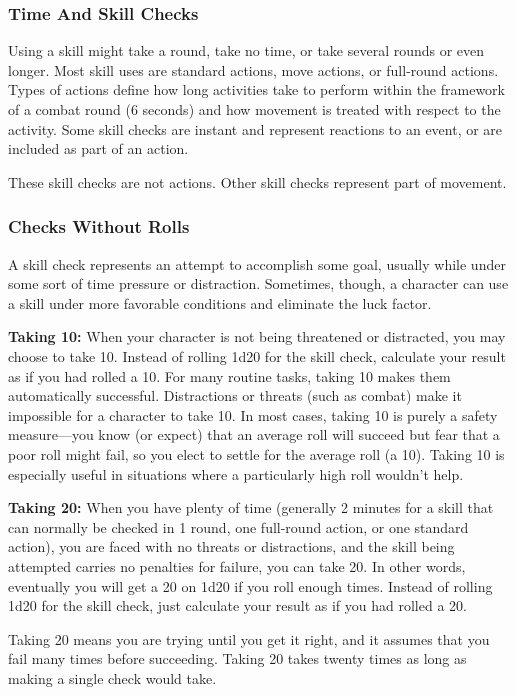 \subsubsection{Time And Skill Checks}
Using a skill might take a round, take no time, or take several rounds or even longer. Most skill uses are standard actions, move actions, or full-round actions. Types of actions define how long activities take to perform within the framework of a combat round (6 seconds) and how movement is treated with respect to the activity. Some skill checks are instant and represent reactions to an event, or are included as part of an action.

These skill checks are not actions. Other skill checks represent part of movement.

\subsubsection{Checks Without Rolls}
A skill check represents an attempt to accomplish some goal, usually while under some sort of time pressure or distraction. Sometimes, though, a character can use a skill under more favorable conditions and eliminate the luck factor.

\textbf{Taking 10:} When your character is not being threatened or distracted, you may choose to take 10. Instead of rolling 1d20 for the skill check, calculate your result as if you had rolled a 10. For many routine tasks, taking 10 makes them automatically successful. Distractions or threats (such as combat) make it impossible for a character to take 10. In most cases, taking 10 is purely a safety measure---you know (or expect) that an average roll will succeed but fear that a poor roll might fail, so you elect to settle for the average roll (a 10). Taking 10 is especially useful in situations where a particularly high roll wouldn't help.

\textbf{Taking 20:} When you have plenty of time (generally 2 minutes for a skill that can normally be checked in 1 round, one full-round action, or one standard action), you are faced with no threats or distractions, and the skill being attempted carries no penalties for failure, you can take 20. In other words, eventually you will get a 20 on 1d20 if you roll enough times. Instead of rolling 1d20 for the skill check, just calculate your result as if you had rolled a 20.

Taking 20 means you are trying until you get it right, and it assumes that you fail many times before succeeding. Taking 20 takes twenty times as long as making a single check would take.

